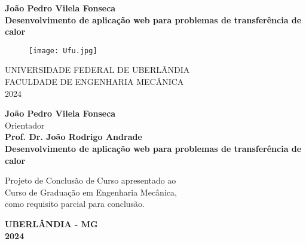 \documentclass[12pt,a4paper]{article}
\begin{document}
\begin{titlepage}
    \begin{center}
        \textbf{João Pedro Vilela Fonseca\\}
        \vspace*{\fill}
        \textbf{\Large Desenvolvimento de aplicação web para problemas de transferência de calor\\}
        \vspace*{\fill}
        \begin{figure}[h]
            \center
            \texttt{[image: Ufu.jpg]}
        \end{figure}
        UNIVERSIDADE FEDERAL DE UBERLÂNDIA\\
        \vspace{0.3cm}
        FACULDADE DE ENGENHARIA MECÂNICA\\
        \vspace{0.3cm}
        2024
    \end{center}
\end{titlepage}

\begin{titlepage}
    \begin{center}
        \textbf{\large João Pedro Vilela Fonseca\\}
        \vspace*{\fill}
        Orientador\\
        \textbf{\large Prof. Dr. João Rodrigo Andrade\\}
        \vspace*{\fill}
        \textbf{\Large Desenvolvimento de aplicação web para problemas de transferência de calor\\}
        \vspace*{\fill}
        \begin{adjustwidth}{7cm}{0cm}
            Projeto de Conclusão de Curso apresentado ao\\Curso de Graduação em Engenharia Mecânica,\\como requisito parcial para conclusão.
        \end{adjustwidth}
        \vspace*{\fill}
        \textbf{UBERLÂNDIA - MG\\}
        \textbf{2024}
    \end{center}
\end{titlepage}

\begin{center}
    \tableofcontents
\end{center}
\end{document}

